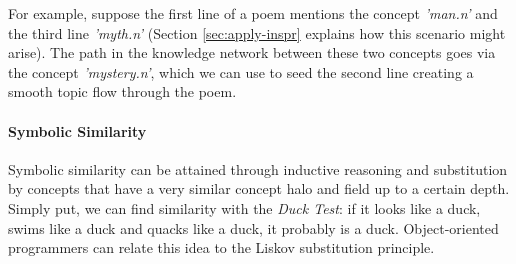 For example, suppose the first line of a poem mentions the concept \textit{'man.n'} and the third line \textit{'myth.n'} (Section \ref{sec:apply-inspr} explains how this scenario might arise). The path in the knowledge network between these two concepts goes via the concept \textit{'mystery.n'}, which we can use to seed the second line creating a smooth topic flow through the poem.


\paragraph{Symbolic Similarity}
Symbolic similarity can be attained through inductive reasoning and substitution by concepts that have a very similar concept halo and field up to a certain depth. Simply put, we can find similarity with the \textit{Duck Test}: if it looks like a duck, swims like a duck and quacks like a duck, it probably is a duck. Object-oriented programmers can relate this idea to the Liskov substitution principle\cite{martin2003agile}.

